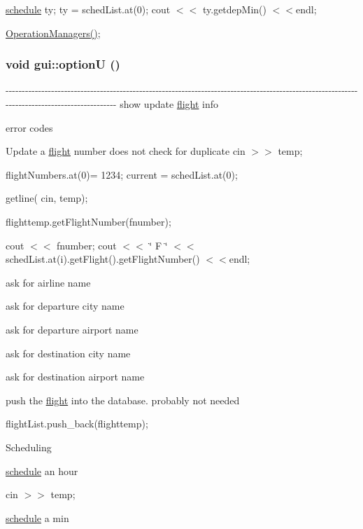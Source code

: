 \hyperlink{classschedule}{schedule} ty; ty = schedList.at(0); cout $<$$<$ ty.getdepMin() $<$$<$endl;

\hyperlink{classgui_afe37700bacd80503661c4f45b55019bd}{OperationManagers()}; \hypertarget{classgui_ad6587b34a7c6f8c087af1665f5dd7b71}{
\subsubsection[{optionU}]{\setlength{\rightskip}{0pt plus 5cm}void gui::optionU ()}}
\label{classgui_ad6587b34a7c6f8c087af1665f5dd7b71}
-\/-\/-\/-\/-\/-\/-\/-\/-\/-\/-\/-\/-\/-\/-\/-\/-\/-\/-\/-\/-\/-\/-\/-\/-\/-\/-\/-\/-\/-\/-\/-\/-\/-\/-\/-\/-\/-\/-\/-\/-\/-\/-\/-\/-\/-\/-\/-\/-\/-\/-\/-\/-\/-\/-\/-\/-\/-\/-\/-\/-\/-\/-\/-\/-\/-\/-\/-\/-\/-\/-\/-\/-\/-\/-\/-\/-\/-\/-\/-\/-\/-\/-\/-\/-\/-\/-\/-\/-\/-\/-\/-\/-\/-\/-\/-\/-\/-\/-\/-\/-\/-\/-\/-\/-\/-\/-\/-\/-\/-\/-\/-\/-\/-\/-\/-\/-\/-\/-\/-\/-\/-\/-\/-\/-\/-\/-\/-\/-\/-\/-\/-\/-\/-\/-\/-\/-\/-\/-\/-\/-\/-\/ show update \hyperlink{classflight}{flight} info 

error codes

Update a \hyperlink{classflight}{flight} number does not check for duplicate cin $>$$>$ temp;

flightNumbers.at(0)= 1234; current = schedList.at(0);

getline( cin, temp);

flighttemp.getFlightNumber(fnumber);

cout $<$$<$ fnumber; cout $<$$<$ \char`\"{} F \char`\"{} $<$$<$ schedList.at(i).getFlight().getFlightNumber() $<$$<$endl;

ask for airline name

ask for departure city name

ask for departure airport name

ask for destination city name

ask for destination airport name

push the \hyperlink{classflight}{flight} into the database. probably not needed

flightList.push\_\-back(flighttemp);

Scheduling

\hyperlink{classschedule}{schedule} an hour

cin $>$$>$ temp;

\hyperlink{classschedule}{schedule} a min


